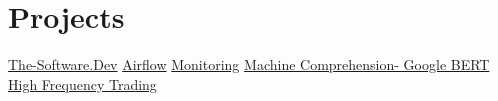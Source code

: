 \documentclass[]{Vishnu-Resume}
\begin{document}
\begin{minipage}[t]{0.66\textwidth}

\section{Projects}
\textbullet{} \href{https://github.com/zxingz/WebApp}{The-Software.Dev} \textbullet{} \href{https://github.com/zxingz/Workflow}{Airflow} \textbullet{} \href{https://github.com/zxingz/Monitoring}{Monitoring} \textbullet{} \href{https://github.com/zxingz/machine_comprehension}{Machine Comprehension- Google BERT}  \textbullet{} \href{https://github.com/zxingz/trader}{High Frequency Trading}

\end{minipage} 
\end{document}
